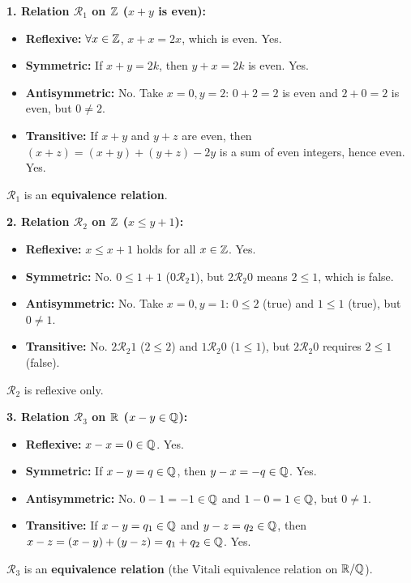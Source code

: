 \begin{solution}
\textbf{1. Relation $\mathcal{R}_1$ on $\mathbb{Z}$ ($x + y$ is even):}
\begin{itemize}[leftmargin=1.5em,itemsep=1pt]
  \item \textbf{Reflexive:} $\forall x \in \mathbb{Z}$, $x + x = 2x$, which is even. Yes.
  \item \textbf{Symmetric:} If $x + y = 2k$, then $y + x = 2k$ is even. Yes.
  \item \textbf{Antisymmetric:} No. Take $x = 0, y = 2$: $0+2=2$ is even and $2+0=2$ is even, but $0 \ne 2$.
  \item \textbf{Transitive:} If $x+y$ and $y+z$ are even, then $(x+z) = (x+y) + (y+z) - 2y$ is a sum of even integers, hence even. Yes.
\end{itemize}
$\mathcal{R}_1$ is an \textbf{equivalence relation}.

\textbf{2. Relation $\mathcal{R}_2$ on $\mathbb{Z}$ ($x \le y + 1$):}
\begin{itemize}[leftmargin=1.5em,itemsep=1pt]
  \item \textbf{Reflexive:} $x \le x + 1$ holds for all $x \in \mathbb{Z}$. Yes.
  \item \textbf{Symmetric:} No. $0 \le 1 + 1$ ($0 \mathcal{R}_2 1$), but $2 \mathcal{R}_2 0$ means $2 \le 1$, which is false.
  \item \textbf{Antisymmetric:} No. Take $x = 0, y = 1$: $0 \le 2$ (true) and $1 \le 1$ (true), but $0 \ne 1$.
  \item \textbf{Transitive:} No. $2 \mathcal{R}_2 1$ ($2 \le 2$) and $1 \mathcal{R}_2 0$ ($1 \le 1$), but $2 \mathcal{R}_2 0$ requires $2 \le 1$ (false).
\end{itemize}
$\mathcal{R}_2$ is reflexive only.

\textbf{3. Relation $\mathcal{R}_3$ on $\mathbb{R}$ ($x - y \in \mathbb{Q}$):}
\begin{itemize}[leftmargin=1.5em,itemsep=1pt]
  \item \textbf{Reflexive:} $x - x = 0 \in \mathbb{Q}$. Yes.
  \item \textbf{Symmetric:} If $x - y = q \in \mathbb{Q}$, then $y - x = -q \in \mathbb{Q}$. Yes.
  \item \textbf{Antisymmetric:} No. $0 - 1 = -1 \in \mathbb{Q}$ and $1 - 0 = 1 \in \mathbb{Q}$, but $0 \ne 1$.
  \item \textbf{Transitive:} If $x - y = q_1 \in \mathbb{Q}$ and $y - z = q_2 \in \mathbb{Q}$, then $x - z = (x - y) + (y - z) = q_1 + q_2 \in \mathbb{Q}$. Yes.
\end{itemize}
$\mathcal{R}_3$ is an \textbf{equivalence relation} (the Vitali equivalence relation on $\mathbb{R}/\mathbb{Q}$).


\end{solution}
